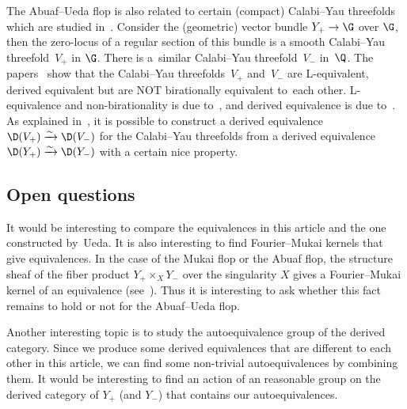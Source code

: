 The Abuaf--Ueda flop is also related to certain (compact) Calabi--Yau threefolds which are studied in~\cite{IMOU16a, IMOU16b, Kuz18}.
Consider the (geometric) vector bundle $Y_+ \to \G$ over $\G$,
then the zero-locus of a regular section of this bundle is a smooth Calabi--Yau threefold~$V_+$ in $\G$.
There is a~similar Calabi--Yau threefold~$V_-$ in~$\Q$.
The papers~\cite{IMOU16b, Kuz18} show that the Calabi--Yau threefolds~$V_+$ and~$V_-$ are L-equivalent, derived equivalent
but are NOT birationally equivalent to~each other.
L-equivalence and non-birationality is due to~\cite{IMOU16b}, and derived equivalence is due to~\cite{Kuz18}.
As explained in~\cite{Ued16}, it is possible to construct a derived equivalence $\D(V_+) \xrightarrow{\sim} \D(V_-)$
for the Calabi--Yau threefolds from a derived equivalence $\D(Y_+) \xrightarrow{\sim} \D(Y_-)$ with a certain nice property.

\subsection{Open questions}
It would be interesting to compare the equivalences in this article and the one constructed by~Ueda.
It is also interesting to find Fourier--Mukai kernels that give equivalences.
In the case of the Mukai flop or the Abuaf flop, the structure sheaf of the fiber product $Y_+ \times_X Y_-$ over the singularity $X$
gives a Fourier--Mukai kernel of an equivalence (see~\cite{H17b, Ka02, Na03}).
Thus it is interesting to ask whether this fact remains to hold or not for the Abuaf--Ueda flop.

Another interesting topic is to study the autoequivalence group of the derived category.
Since we produce some derived equivalences that are different to each other in this article, we can find some non-trivial autoequivalences
by combining them.
It would be interesting to find an action of an reasonable group on the derived category of $Y_+$ (and $Y_-$)
that contains our autoequivalences.

